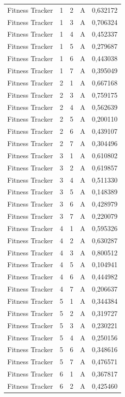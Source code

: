 \begin{longtable}{lrrrr}
Fitness Tracker & 1 & 2 & A & 0,632172 \\
Fitness Tracker & 1 & 3 & A & 0,706324 \\
Fitness Tracker & 1 & 4 & A & 0,452337 \\
Fitness Tracker & 1 & 5 & A & 0,279687 \\
Fitness Tracker & 1 & 6 & A & 0,443038 \\
Fitness Tracker & 1 & 7 & A & 0,395049 \\
Fitness Tracker & 2 & 1 & A & 0,667168 \\
Fitness Tracker & 2 & 3 & A & 0,759175 \\
Fitness Tracker & 2 & 4 & A & 0,562639 \\
Fitness Tracker & 2 & 5 & A & 0,200110 \\
Fitness Tracker & 2 & 6 & A & 0,439107 \\
Fitness Tracker & 2 & 7 & A & 0,304496 \\
Fitness Tracker & 3 & 1 & A & 0,610802 \\
Fitness Tracker & 3 & 2 & A & 0,619857 \\
Fitness Tracker & 3 & 4 & A & 0,511330 \\
Fitness Tracker & 3 & 5 & A & 0,148389 \\
Fitness Tracker & 3 & 6 & A & 0,428979 \\
Fitness Tracker & 3 & 7 & A & 0,220079 \\
Fitness Tracker & 4 & 1 & A & 0,595326 \\
Fitness Tracker & 4 & 2 & A & 0,630287 \\
Fitness Tracker & 4 & 3 & A & 0,800512 \\
Fitness Tracker & 4 & 5 & A & 0,104941 \\
Fitness Tracker & 4 & 6 & A & 0,444982 \\
Fitness Tracker & 4 & 7 & A & 0,206637 \\
Fitness Tracker & 5 & 1 & A & 0,344384 \\
Fitness Tracker & 5 & 2 & A & 0,319727 \\
Fitness Tracker & 5 & 3 & A & 0,230221 \\
Fitness Tracker & 5 & 4 & A & 0,250156 \\
Fitness Tracker & 5 & 6 & A & 0,348616 \\
Fitness Tracker & 5 & 7 & A & 0,476571 \\
Fitness Tracker & 6 & 1 & A & 0,367817 \\
Fitness Tracker & 6 & 2 & A & 0,425460 \\

\end{longtable}
